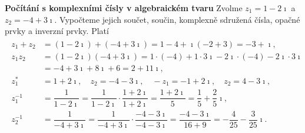 \begin{mdframed}[style=mdexam]
  \begin{example}\label{mai:exam078}
    \textbf{Počítání s komplexními čísly v algebraickém tvaru}\newline
      Zvolme \(z_1 = 1-2\imath\) a \(z_2 =-4+3\imath\). Vypočteme jejich součet, součin, komplexně sdružená 
      čísla, opačné prvky a inverzní prvky. Platí
      \begin{gather*}
        \begin{aligned}
          z_1 + z_2 &= (1-2\imath) +(-4+3\imath) = 1 - 4 + \imath(-2+3) = -3 + \imath,                             \\
          z_1z_2    &= (1-2\imath)(-4+3\imath) = 1\cdot(-4) +1\cdot3\imath -2\imath\cdot(-4) -2\imath\cdot3\imath  \\
                    &= -4 + 3\imath + 8\imath + 6 = 2 + 11\imath,                                                  \\
          z_1^*     &= 1+2\imath, \quad z_2 =-4-3\imath, \quad -z_1 = -1+2\imath, \quad z_2 =4-3\imath,            \\
          z_1^{-1}  &= \dfrac{1}{1-2\imath} = \dfrac{1}{1-2\imath}\cdot \dfrac{1+2\imath}{1+2\imath}                 
                     = \dfrac{1+2\imath}{5} = \dfrac{1}{5} + \dfrac{2}{5}\imath,                                   \\
          z_2^{-1}  &= \dfrac{1}{-4+3\imath} = \dfrac{1}{-4+3\imath}\cdot\dfrac{-4-3\imath}{-4-3\imath}               
                     = \dfrac{-4-3\imath}{16+9} = -\dfrac{4}{25} - \dfrac{3}{25}\imath.
        \end{aligned}
    \end{gather*}
  \end{example}
\end{mdframed}